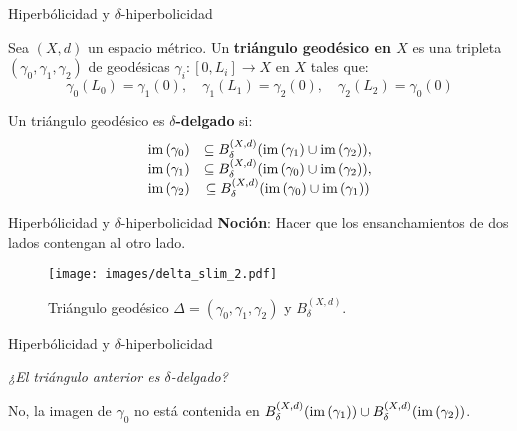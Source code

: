 \documentclass[xcolor=dvipsnames,aspectratio=159]{beamer}
\theoremstyle{largebreak}
\newcommand\cf[3]{\ensuremath{#1:#2\rightarrow#3}}
\newcommand{\im}[1]{\ensuremath{\textup{im}\left(#1\right)}}
\begin{document}
\begin{frame}{Hiperbólicidad y $\delta$-hiperbolicidad}
    \begin{mydef}
        Sea $(X,d)$ un espacio métrico. Un \textbf{triángulo geodésico en $X$} es una tripleta $(\gamma_0,\gamma_1,\gamma_2)$ de geodésicas $\cf{\gamma_i}{[0,L_i]}{X}$ en $X$ tales que:
        \begin{equation*}
            \gamma_0(L_0)=\gamma_1(0),\quad \gamma_1(L_1)=\gamma_2(0),\quad \gamma_2(L_2)=\gamma_0(0)
        \end{equation*}
    \end{mydef}

    \begin{mydef}
        Un triángulo geodésico es \textbf{$\delta$-delgado} si:
        \begin{equation*}
            \begin{array}{cc}
                \im{\gamma_0}&\subseteq B_{\delta}^{(X,d)}(\im{\gamma_1}\cup\im{\gamma_2}),\\
                \im{\gamma_1}&\subseteq B_{\delta}^{(X,d)}(\im{\gamma_0}\cup\im{\gamma_2}),\\
                \im{\gamma_2}&\subseteq B_{\delta}^{(X,d)}(\im{\gamma_0}\cup\im{\gamma_1})
            \end{array}
        \end{equation*}
    \end{mydef}
\end{frame}

\begin{frame}{Hiperbólicidad y $\delta$-hiperbolicidad}
    \textbf{Noción}: Hacer que los ensanchamientos de dos lados contengan al otro lado.
    \pause    
    \begin{figure}
        \begin{center}
            \texttt{[image: images/delta\_slim\_2.pdf]}
        \end{center}
        \caption{Triángulo geodésico $\Delta=(\gamma_0,\gamma_1,\gamma_2)$ y $B_\delta^{(X,d)}$.}
    \end{figure}
\end{frame}


\begin{frame}{Hiperbólicidad y $\delta$-hiperbolicidad}
    \begin{center}
        \textit{\Large ¿El triángulo anterior es $\delta$-delgado?}
    
        \pause

        \hfill\break

        \Large No, la imagen de $\gamma_0$ no está contenida en $B_\delta^{(X,d)}(\im{\gamma_1})\cup B_\delta^{(X,d)}(\im{\gamma_2})$.
    \end{center}
\end{frame}
\end{document}
